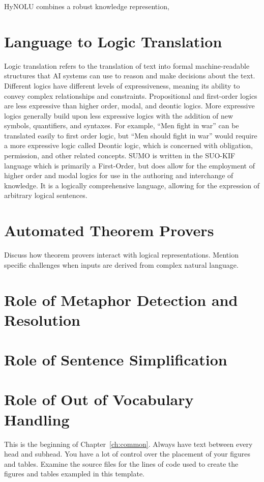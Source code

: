 HyNOLU combines a robust knowledge represention, 

\section{Language to Logic Translation}

Logic translation refers to the translation of text into formal machine-readable structures that AI systems can use to reason and make decisions about the text. Different logics have different levels of expressiveness, meaning its ability to convey complex relationships and constraints. Propositional and first-order logics are less expressive than higher order, modal, and deontic logics. More expressive logics generally build upon less expressive logics with the addition of new symbols, quantifiers, and syntaxes. For example, ``Men fight in war'' can be translated easily to first order logic, but ``Men should fight in war'' would require a more expressive logic called Deontic logic, which is concerned with obligation, permission, and other related concepts. SUMO is written in the SUO-KIF language which is primarily a First-Order, but does allow for the employment of higher order and modal logics for use in the authoring and interchange of knowledge. It is a logically comprehensive language, allowing for the expression of arbitrary logical sentences.


\section{Automated Theorem Provers}
Discuss how theorem provers interact with logical representations. Mention specific challenges when inputs are derived from complex natural language.

\section{Role of Metaphor Detection and Resolution}

\section{Role of Sentence Simplification}

\section{Role of Out of Vocabulary Handling}
This is the beginning of Chapter~\ref{ch:common}. 
Always have text between every head and subhead. You have a lot of control over the placement of your figures and tables. Examine the source files for the lines of code used to create the figures and tables exampled in this template. 


